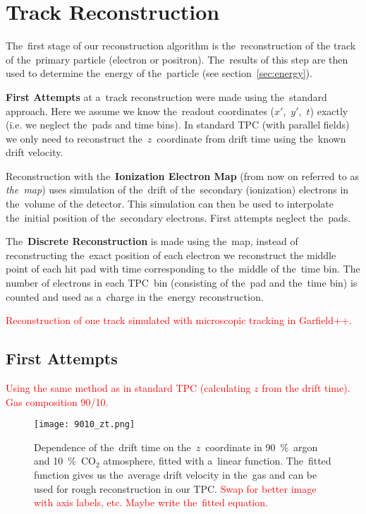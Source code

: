 \chapter{Track Reconstruction}
\label{sec:track}
	The~first stage of our reconstruction algorithm is the~reconstruction of the track of the~primary particle (electron or positron). The~results of this step are then used to determine the~energy of the~particle (see section~\ref{sec:energy}).
	
	\textbf{First Attempts} at a~track reconstruction were made using the~standard approach. Here we assume we know the~readout coordinates ($x'$,~$y'$,~$t$) exactly (i.e. we neglect the~pads and time bins). In standard TPC (with parallel fields) we only need to reconstruct the~$z$~coordinate from drift time using the~known drift velocity.
	
	Reconstruction with the~\textbf{Ionization Electron Map} (from now on referred to as \emph{the~map}) uses simulation of the~drift of the~secondary (ionization) electrons in the~volume of the detector. This simulation can then be used to interpolate the~initial position of the~secondary electrons. First attempts neglect the~pads.
	
	The~\textbf{Discrete Reconstruction} is made using the~map, instead of reconstructing the~exact position of each electron we reconstruct the middle point of each hit pad with time corresponding to the~middle of the~time bin. The number of electrons in each TPC~bin (consisting of the~pad and the~time bin) is counted and used as a~charge in the~energy reconstruction.
	
	\textcolor{red}{Reconstruction of one track simulated with microscopic tracking in Garfield++.}
	
	\section{First Attempts}
		\textcolor{red}{Using the same method as in standard TPC (calculating $z$ from the drift time). Gas composition 90/10.}
		
		\begin{figure}
			\centering
			\texttt{[image: 9010\_zt.png]}
			\caption{Dependence of the~drift time on the~$z$~coordinate in 90~\%~argon and 10~\%~CO$_2$ atmosphere, fitted with a~linear function. The~fitted function gives us the~average drift velocity in the~gas and can be used for rough reconstruction in our TPC. \textcolor{red}{Swap for better image with axis labels, etc. Maybe write the~fitted equation.}}
			\label{fig:9010zt}
		\end{figure}
		
